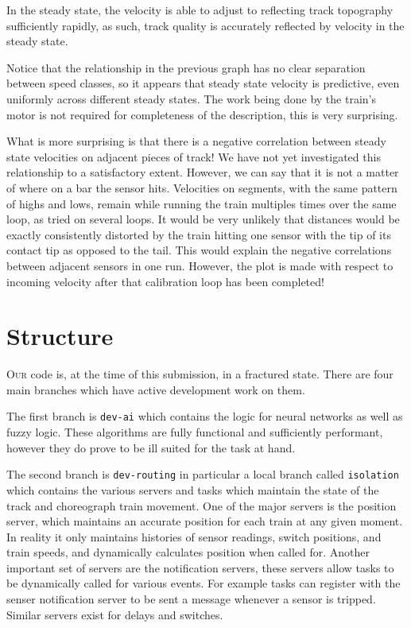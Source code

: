 \documentclass{amsart} \usepackage{amsmath} \usepackage{upgreek}
\begin{document}
\begin{conj}
In the steady state, the velocity is able to adjust to reflecting track topography sufficiently rapidly, as such, track quality is accurately reflected by velocity in the steady state.
\end{conj}

Notice that the relationship in the previous graph has no clear separation between speed classes, so it appears that steady state velocity is predictive, even uniformly across different steady states. The work being done by the train's motor is not required for completeness of the description, this is very surprising.

What is more surprising is that there is a negative correlation between steady state velocities on adjacent pieces of track! We have not yet investigated this relationship to a satisfactory extent. However, we can say that it is not a matter of where on a bar the sensor hits. Velocities on segments, with the same pattern of highs and lows, remain while running the train multiples times over the same loop, as tried on several loops. It would be very unlikely that distances would be exactly consistently distorted by the train hitting one sensor with the tip of its contact tip as opposed to the tail. This would explain the negative correlations between adjacent sensors in one run. However, the plot is made with respect to incoming velocity after that calibration loop has been completed!


\clearpage

\section*{Structure}

\textsc{Our} code is, at the time of this submission, in a fractured state.
There are four main branches which have active development work on them.

The first branch is \texttt{dev-ai} which contains the logic for neural networks
as well as fuzzy logic. These algorithms are fully functional and sufficiently
performant, however they do prove to be ill suited for the task at hand.

The second branch is \texttt{dev-routing} in particular a local branch called
\texttt{isolation} which contains the various servers and tasks which maintain
the state of the track and choreograph train movement. One of the major servers
is the position server, which maintains an accurate position for each train at
any given moment. In reality it only maintains histories of sensor readings,
switch positions, and train speeds, and dynamically calculates position when
called for. Another important set of servers are the notification servers, these
servers allow tasks to be dynamically called for various events. For example
tasks can register with the senser notification server to be sent a message
whenever a sensor is tripped. Similar servers exist for delays and switches.
\end{document}
